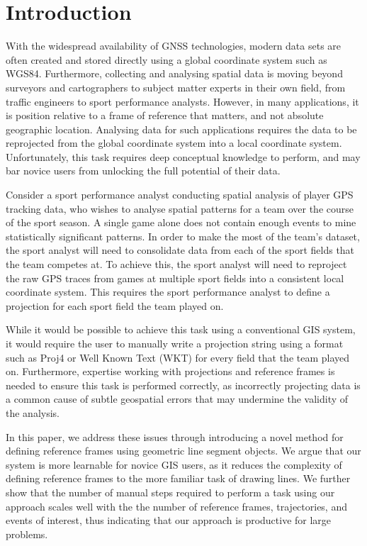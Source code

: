 \section{Introduction}



With the widespread availability of GNSS technologies, modern data sets are often created and stored directly using a global coordinate system such as WGS84. Furthermore, collecting and analysing spatial data is moving beyond surveyors and cartographers to subject matter experts in their own field, from traffic engineers to sport performance analysts. However, in many applications, it is position relative to a frame of reference that matters, and not absolute geographic location. Analysing data for such applications requires the data to be reprojected from the global coordinate system into a local coordinate system. Unfortunately, this task requires deep conceptual knowledge to perform, and may bar novice users from unlocking the full potential of their data.




Consider a sport performance analyst conducting spatial analysis of player GPS tracking data, who wishes to analyse spatial patterns for a team over the course of the sport season. A single game alone does not contain enough events to mine statistically significant patterns. In order to make the most of the team's dataset, the sport analyst will need to consolidate data from each of the sport fields that the team competes at. To achieve this, the sport analyst will need to reproject the raw GPS traces from games at multiple sport fields into a consistent local coordinate system. This requires the sport performance analyst to define a projection for each sport field the team played on.

While it would be possible to achieve this task using a conventional GIS system, it would require the user to manually write a projection string using a format such as Proj4 or Well Known Text (WKT) for every field that the team played on. Furthermore, expertise working with projections and reference frames is needed to ensure this task is performed correctly, as incorrectly projecting data is a common cause of subtle geospatial errors that may undermine the validity of the analysis.

In this paper, we address these issues through introducing a novel method for defining reference frames using geometric line segment objects. We argue that our system is more learnable for novice GIS users, as it reduces the complexity of defining reference frames to the more familiar task of drawing lines. We further show that the number of manual steps required to perform a task using our approach scales well with the the number of reference frames, trajectories, and events of interest, thus indicating that our approach is productive for large problems.




